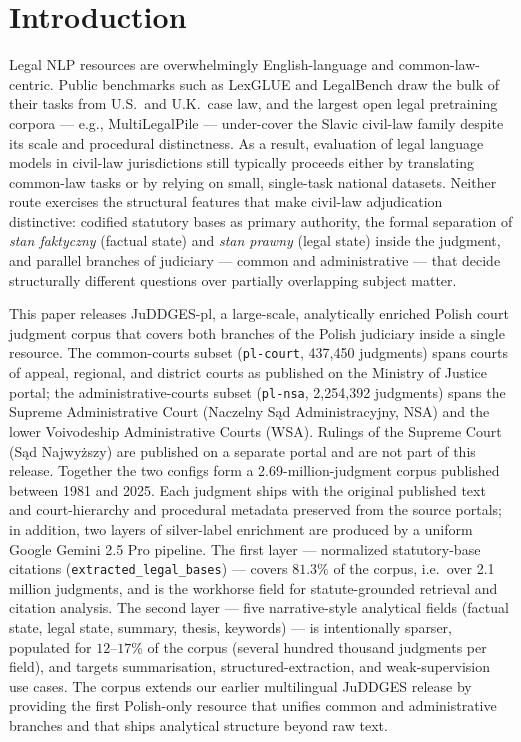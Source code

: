 \documentclass{article}
\begin{document}
\section{Introduction}
\label{sec:introduction}

Legal NLP resources are overwhelmingly English-language and common-law-centric. Public benchmarks such as LexGLUE \citep{chalkidis-etal-2022-lexglue} and LegalBench \citep{guhaLegalbenchCollaborativelyBuilt2023a} draw the bulk of their tasks from U.S.\ and U.K.\ case law, and the largest open legal pretraining corpora --- e.g., MultiLegalPile \citep{niklaus2024multilegalpile689gbmultilinguallegal} --- under-cover the Slavic civil-law family despite its scale and procedural distinctness. As a result, evaluation of legal language models in civil-law jurisdictions still typically proceeds either by translating common-law tasks or by relying on small, single-task national datasets. Neither route exercises the structural features that make civil-law adjudication distinctive: codified statutory bases as primary authority, the formal separation of \emph{stan faktyczny} (factual state) and \emph{stan prawny} (legal state) inside the judgment, and parallel branches of judiciary --- common and administrative --- that decide structurally different questions over partially overlapping subject matter.

This paper releases JuDDGES-pl, a large-scale, analytically enriched Polish court judgment corpus that covers both branches of the Polish judiciary inside a single resource. The common-courts subset (\texttt{pl-court}, 437{,}450 judgments) spans courts of appeal, regional, and district courts as published on the Ministry of Justice portal; the administrative-courts subset (\texttt{pl-nsa}, 2{,}254{,}392 judgments) spans the Supreme Administrative Court (Naczelny Sąd Administracyjny, NSA) and the lower Voivodeship Administrative Courts (WSA). Rulings of the Supreme Court (Sąd Najwyższy) are published on a separate portal and are not part of this release. Together the two configs form a 2.69-million-judgment corpus published between 1981 and 2025. Each judgment ships with the original published text and court-hierarchy and procedural metadata preserved from the source portals; in addition, two layers of silver-label enrichment are produced by a uniform Google Gemini 2.5 Pro pipeline. The first layer --- normalized statutory-base citations (\texttt{extracted\_legal\_bases}) --- covers $81.3\%$ of the corpus, i.e.\ over 2.1 million judgments, and is the workhorse field for statute-grounded retrieval and citation analysis. The second layer --- five narrative-style analytical fields (factual state, legal state, summary, thesis, keywords) --- is intentionally sparser, populated for $12$--$17\%$ of the corpus (several hundred thousand judgments per field), and targets summarisation, structured-extraction, and weak-supervision use cases. The corpus extends our earlier multilingual JuDDGES release \citep{augustyniak2024juddges} by providing the first Polish-only resource that unifies common and administrative branches and that ships analytical structure beyond raw text.
\end{document}

